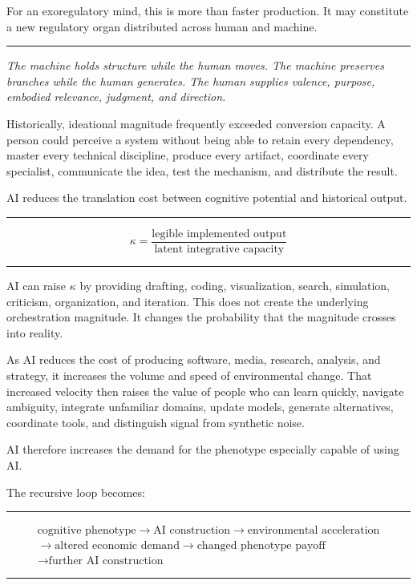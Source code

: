 \documentclass[10pt]{article}
\newcommand{\ActiveAccent}{Industrial}
\newcommand{\subhead}[1]{\Needspace{4\baselineskip}\vspace{0.5em}{\sffamily\bfseries\fontsize{10.5}{13}\selectfont\textcolor{\ActiveAccent}{#1}}\par\vspace{-0.1em}}
\newcommand{\pullquote}[1]{%
  \begin{center}\vspace{0.45em}
  \begin{minipage}{0.88\linewidth}
  {\color{\ActiveAccent}\rule{0.28in}{2.2pt}}\par\vspace{0.45em}
  {\fontsize{13.5}{18}\selectfont\itshape #1}\par
  \vspace{0.5em}{\color{\ActiveAccent}\rule{0.28in}{2.2pt}}
  \end{minipage}\vspace{0.45em}\end{center}
}
\newenvironment{equationpanel}{\begin{center}\begin{minipage}{0.92\linewidth}\color{\ActiveAccent}\rule{\linewidth}{0.55pt}\par\vspace{-0.25em}\color{Ink}}{\vspace{-0.10em}\par\color{\ActiveAccent}\rule{\linewidth}{0.55pt}\end{minipage}\end{center}}
\begin{document}
For an exoregulatory mind, this is more than faster production. It may constitute a new regulatory organ distributed across human and machine.

\pullquote{The machine holds structure while the human moves. The machine preserves branches while the human generates. The human supplies valence, purpose, embodied relevance, judgment, and direction.}

\subhead{3. AI as a conversion amplifier}

Historically, ideational magnitude frequently exceeded conversion capacity. A person could perceive a system without being able to retain every dependency, master every technical discipline, produce every artifact, coordinate every specialist, communicate the idea, test the mechanism, and distribute the result.

AI reduces the translation cost between cognitive potential and historical output.

\begin{equationpanel}
\begin{equation*}
\kappa = \frac{\text{legible implemented output}}{\text{latent integrative capacity}}
\end{equation*}
\end{equationpanel}

AI can raise $\kappa$ by providing drafting, coding, visualization, search, simulation, criticism, organization, and iteration. This does not create the underlying orchestration magnitude. It changes the probability that the magnitude crosses into reality.

\subhead{4. AI as an environmental accelerator}

As AI reduces the cost of producing software, media, research, analysis, and strategy, it increases the volume and speed of environmental change. That increased velocity then raises the value of people who can learn quickly, navigate ambiguity, integrate unfamiliar domains, update models, generate alternatives, coordinate tools, and distinguish signal from synthetic noise.

AI therefore increases the demand for the phenotype especially capable of using AI.

\subhead{5. AI as a selection feedback variable}

The recursive loop becomes:

\begin{equationpanel}
\begin{equation*}
\begin{gathered}
\text{cognitive phenotype}\rightarrow\text{AI construction}\rightarrow\text{environmental acceleration}\\
\rightarrow\text{altered economic demand}\rightarrow\text{changed phenotype payoff}\\
\rightarrow\text{further AI construction}
\end{gathered}
\end{equation*}
\end{equationpanel}
\end{document}
